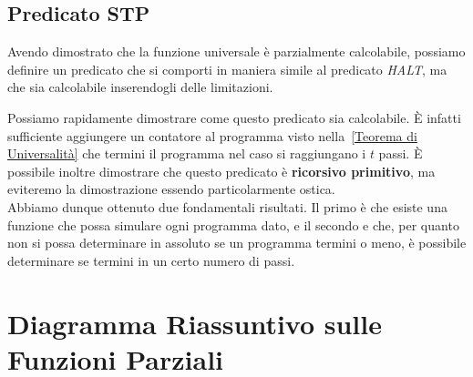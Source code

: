 \subsection{Predicato STP}

Avendo dimostrato che la funzione universale è parzialmente calcolabile, possiamo definire un predicato che si comporti in maniera simile al predicato \textit{HALT}, ma che sia calcolabile inserendogli delle limitazioni.


Possiamo rapidamente dimostrare come questo predicato sia calcolabile. È infatti sufficiente aggiungere un contatore al programma visto nella~\ref{Teorema di Universalità} che termini il programma nel caso si raggiungano i \(t\) passi. È possibile inoltre dimostrare che questo predicato è \textbf{ricorsivo primitivo}, ma eviteremo la dimostrazione essendo particolarmente ostica.\\
Abbiamo dunque ottenuto due fondamentali risultati. Il primo è che esiste una funzione che possa simulare ogni programma dato, e il secondo e che, per quanto non si possa determinare in assoluto se un programma termini o meno, è possibile determinare se termini in un certo numero di passi.

\newpage
\section{Diagramma Riassuntivo sulle Funzioni Parziali}

